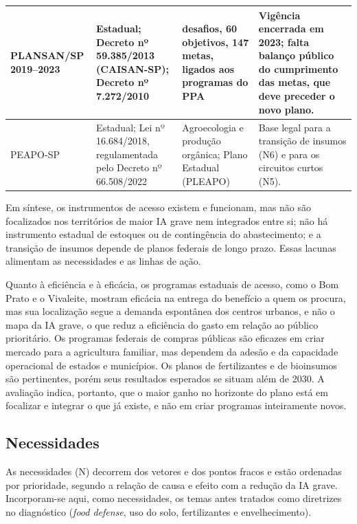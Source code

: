 \documentclass[
	12pt,				%
	openright,			%
	oneside,			%
	a4paper,			%
	chapter=TITLE,		%
	section=TITLE,		%
	english,			%
	french,				%
	spanish,			%
	brazil,				%
 ]{abntex2}
\begin{document}
\begin{quadro}[!htbp]
\begin{tabularx}{\textwidth}{|>{\raggedright\arraybackslash}p{2.4cm}|>{\raggedright\arraybackslash}p{3.0cm}|>{\raggedright\arraybackslash}p{3.4cm}|>{\raggedright\arraybackslash}X|}
\hline
PLANSAN/SP 2019--2023 & Estadual; Decreto nº 59.385/2013 (CAISAN-SP); Decreto nº 7.272/2010 & 9 desafios, 60 objetivos, 147 metas, ligados aos programas do PPA & Vigência encerrada em 2023; falta balanço público do cumprimento das metas, que deve preceder o novo plano. \\
\hline
PEAPO-SP & Estadual; Lei nº 16.684/2018, regulamentada pelo Decreto nº 66.508/2022 & Agroecologia e produção orgânica; Plano Estadual (PLEAPO) & Base legal para a transição de insumos (N6) e para os circuitos curtos (N5). \\
\hline
\end{tabularx}
\end{quadro}

Em síntese, os instrumentos de acesso existem e funcionam, mas não são
focalizados nos territórios de maior IA grave nem integrados entre si; não há
instrumento estadual de estoques ou de contingência do abastecimento; e a
transição de insumos depende de planos federais de longo prazo. Essas lacunas
alimentam as necessidades e as linhas de ação.

Quanto à eficiência e à eficácia, os programas estaduais de acesso, como o Bom
Prato e o Vivaleite, mostram eficácia na entrega do benefício a quem os procura,
mas sua localização segue a demanda espontânea dos centros urbanos, e não o
mapa da IA grave, o que reduz a eficiência do gasto em relação ao público
prioritário. Os programas federais de compras públicas são eficazes em criar
mercado para a agricultura familiar, mas dependem da adesão e da capacidade
operacional de estados e municípios. Os planos de fertilizantes e de bioinsumos
são pertinentes, porém seus resultados esperados se situam além de 2030. A
avaliação indica, portanto, que o maior ganho no horizonte do plano está em
focalizar e integrar o que já existe, e não em criar programas inteiramente
novos.

\subsection{Necessidades}
As necessidades (N) decorrem dos vetores e dos pontos fracos e estão
ordenadas por prioridade, segundo a relação de causa e efeito com a redução da
IA grave. Incorporam-se aqui, como necessidades,
os temas antes tratados como diretrizes no diagnóstico (\textit{food defense},
uso do solo, fertilizantes e envelhecimento).
\end{document}
